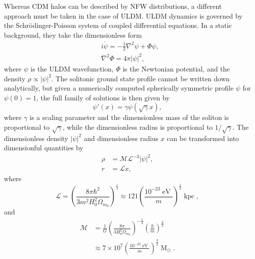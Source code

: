 \documentclass{pasa}%
\begin{document}
Whereas CDM halos can be described by NFW distributions, a different approach must be taken in the case of ULDM. ULDM dynamics is governed by the Schr{\"o}dinger-Poisson system of coupled differential equations. In a static background, they take the dimensionless form  
%
\begin{align}
    &i\dot{\psi} = -\frac{1}{2}\nabla^2\psi+\Phi\psi,\\
    &\nabla^2\Phi = 4\pi \vert \psi\vert^2,
\end{align}
%
where $\psi$ is the ULDM wavefunction, $\Phi$ is the Newtonian potential, and the density $\rho \propto |\psi|^2$. The solitonic ground state profile cannot be written down analytically, but given a numerically computed spherically symmetric profile $\psi$ for $\psi(0)=1$, the full family of solutions is then given by
%
\begin{equation}
    \psi'(x) = \gamma\psi(\sqrt{\gamma}x),
\end{equation}
%
where $\gamma$ is a scaling parameter and the dimensionless mass of the soliton is proportional to $\sqrt{\gamma}$, while the dimensionless radius is proportional to $1/\sqrt{\gamma}$. The dimensionless density $\vert\psi\vert^2$ and dimensionless radius $x$ can be transformed into dimensionful quantities by
\begin{align}
    \rho &= \mathcal{M}\mathcal{L}^{-3}\vert\psi\vert^2, \label{eq:density_conv} \\
    r &= \mathcal{L}x, \label{eq:mass_conv}
\end{align}
where
\begin{equation}\label{eq:length}
    \mathcal{L}=\left(\frac{8\pi\hbar^2}{3 m^2H_0^2\Omega_{m_0}}\right)^{\frac{1}{4}}\approx121\left(\frac{10^{-23}\operatorname{eV}}{m}\right)^{\frac{1}{2}}\operatorname{kpc},
\end{equation}
%
and 
%
\begin{align}\label{eq:mass}
    \mathcal{M}&=\frac{1}{G}\left(\frac{8\pi}{3 H_0^2\Omega_{m_0}}\right)^{-\frac{1}{4}}\left(\frac{\hbar}{m}\right)^{\frac{3}{2}}\nonumber\\
    &\approx 7\times 10^7\left(\frac{10^{-23}\operatorname{eV}}{m}\right)^{\frac{3}{2}}\operatorname{M}_{\odot}.
\end{align}
\end{document}
